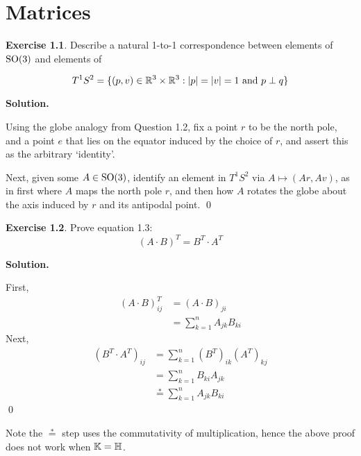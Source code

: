\documentclass[12pt]{book}
\theoremstyle{definition}
\newtheorem{exercise}{Exercise}[chapter]
\newenvironment{solution}
{%
  \par\noindent\textbf{Solution.}\quad
}
{%
  \qed\par
}
\begin{document}
\mainmatter

\chapter{Matrices}

\begin{exercise}
Describe a natural 1-to-1 correspondence between elements of $\mathrm{SO}(3)$ and elements of

\[
T^1S^2 = \{ (p, v) \in \mathbb{R}^3 \times \mathbb{R}^3 : |p| = |v| = 1 \text{ and } p \perp q\}
\]

\end{exercise}

\begin{solution}
Using the globe analogy from Question 1.2, fix a point $r$ to be the north pole, 
and a point $e$ that lies on the equator induced by the choice of $r$, and assert this as the arbitrary `identity'.

Next, given some $A \in \mathrm{SO}(3)$, identify an element in $T^1S^2$ via $A \mapsto (Ar, Av)$, 
as in first where $A$ maps the north pole $r$, and then how $A$ rotates the globe about the axis induced by $r$ and its antipodal point.
\end{solution}

\begin{exercise}
  Prove equation 1.3:
  \[
  (A \cdot B)^T = B^T \cdot A^T
  \]
\end{exercise}

\begin{solution}
  First, 
  \[
    \begin{aligned}
      (A \cdot B)^T_{ij} &= (A \cdot B)_{ji} \\
                         &= \sum_{k=1}^n A_{jk}B_{ki}
   \end{aligned}
  \]
   Next, 
   \[
    \begin{aligned}
      (B^T \cdot A^T)_{ij} &= \sum_{k=1}^n(B^T)_{ik}(A^T)_{kj} \\
                         &= \sum_{k=1}^n B_{ki}A_{jk} \\
                         &\stackrel{*}{=} \sum_{k=1}^n A_{jk}B_{ki}
   \end{aligned}
  \]
\end{solution}

Note the $\stackrel{*}{=}$ step uses the commutativity of multiplication, 
hence the above proof does not work when $\mathbb{K} = \mathbb{H}$.
\end{document}

